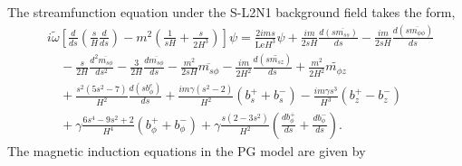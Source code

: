 The streamfunction equation under the S-L2N1 background field takes the form,
\begin{equation}
\begin{aligned}
    &i\widetilde{\omega} \left[\frac{d}{d s}\left(\frac{s}{H}\frac{d}{d s}\right) - m^2 \left(\frac{1}{sH} + \frac{s}{2H^3}\right)\right] \psi =\frac{2 i m s}{\mathrm{Le} H^{3}} \psi + \frac{i m}{2 sH} \frac{d \left(s \overline{m_{ss}}\right)}{d s} - \frac{i m}{2 sH} \frac{d \left(s\overline{m_{\phi\phi}}\right)}{d s} \\
    &\quad - \frac{s}{2 H} \frac{d^{2}\overline{m_{s\phi}}}{d s^{2}} - \frac{3}{2 H} \frac{d\overline{m_{s\phi}}}{d s} - \frac{m^{2}}{2sH} \overline{m_{s\phi}} - \frac{i m}{2 H^{2}} \frac{d \left(s \widetilde{m_{sz}}\right)}{d s} + \frac{m^{2}}{2 H^{2}}\widetilde{m_{\phi z}} \\
    &\quad + \frac{s^{2} \left(5 s^{2} - 7\right)}{H^{2}} \frac{d (s b_{\phi}^e)}{d s} + \frac{i m \gamma \left(s^2 - 2\right)}{H^{2}} \left(b^{+}_{s} + b^{-}_{s}\right) - \frac{i m \gamma s^{3}}{H^{3}} \left(b^{+}_{z} - b^{-}_{z}\right) \\
    &\quad + \gamma \frac{6 s^{4} - 9 s^{2} + 2}{H^{4}} \left(b^{+}_{\phi} + b^{-}_{\phi}\right) + \gamma \frac{s \left(2 - 3 s^{2}\right)}{H^{2}} \left(\frac{db^{+}_{\phi}}{d s} + \frac{db^{-}_{\phi}}{d s} \right).
\end{aligned}
\end{equation}
The magnetic induction equations in the PG model are given by
